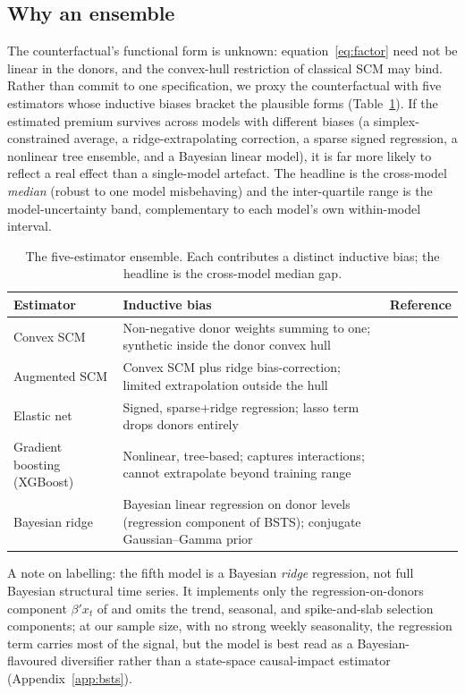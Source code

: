 \documentclass[11pt,a4paper]{article}
\begin{document}
\subsection{Why an ensemble}
The counterfactual's functional form is unknown: equation~\eqref{eq:factor} need not
be linear in the donors, and the convex-hull restriction of classical SCM may bind.
Rather than commit to one specification, we proxy the counterfactual with five
estimators whose inductive biases bracket the plausible forms
(Table~\ref{tab:models}). If the estimated premium survives across models with
different biases (a simplex-constrained average, a ridge-extrapolating correction, a
sparse signed regression, a nonlinear tree ensemble, and a Bayesian linear model), it
is far more likely to reflect a real effect than a single-model artefact. The headline
is the cross-model \emph{median} (robust to one model misbehaving) and the
inter-quartile range is the model-uncertainty band, complementary to each model's own
within-model interval.

\begin{table}[t]
\centering
\caption{The five-estimator ensemble. Each contributes a distinct inductive bias;
the headline is the cross-model median gap.}
\label{tab:models}
\small
\begin{tabular}{@{}p{2.6cm}p{7.4cm}p{4.0cm}@{}}
\toprule
Estimator & Inductive bias & Reference \\
\midrule
Convex SCM & Non-negative donor weights summing to one; synthetic inside the donor convex hull & \citet{abadie2010}\\
Augmented SCM & Convex SCM plus ridge bias-correction; limited extrapolation outside the hull & \citet{benmichael2021}\\
Elastic net & Signed, sparse$+$ridge regression; lasso term drops donors entirely & \citet{zouhastie2005,doudchenko2016}\\
Gradient boosting (XGBoost) & Nonlinear, tree-based; captures interactions; cannot extrapolate beyond training range & \citet{friedman2001,chenguestrin2016}\\
Bayesian ridge & Bayesian linear regression on donor levels (regression component of BSTS); conjugate Gaussian--Gamma prior & \citet{brodersen2015}\\
\bottomrule
\end{tabular}
\end{table}

A note on labelling: the fifth model is a Bayesian \emph{ridge} regression, not full
Bayesian structural time series. It implements only the regression-on-donors component
$\beta'x_t$ of \citet{brodersen2015} and omits the trend, seasonal, and spike-and-slab
selection components; at our sample size, with no strong weekly seasonality, the
regression term carries most of the signal, but the model is best read as a
Bayesian-flavoured diversifier rather than a state-space causal-impact estimator
(Appendix~\ref{app:bsts}).
\end{document}
